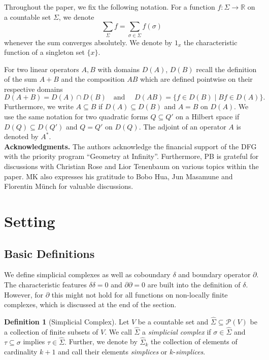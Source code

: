 \documentclass[10pt]{amsart}
\theoremstyle{definition}
\newtheorem{definition}[theorem]{Definition}
\begin{document}
 


Throughout the paper, we fix the following notation. For a function $f:\Sigma\to \mathbb{R}$ on a countable set $\Sigma$, we denote
\begin{equation*}
\sum_{\Sigma}f=	\sum_{\sigma\in \Sigma}f(\sigma)
\end{equation*}
whenever the sum converges absolutely.  We denote by $1_{x}$ the characteristic function of a singleton set $\{x\}$.


For two linear operators $A,B$ with domains $D(A)$, $D(B)$ recall the definition of the sum $A+B$ and the composition $AB$  which are defined pointwise on their respective domains
\begin{equation*}
	D(A+B)=D(A)\cap D(B)\quad \mbox{and }\quad D(AB)=\{f\in D(B)\mid Bf\in D(A)\}.
\end{equation*}
Furthermore, we write $A\subseteq B$ if $D(A) \subseteq D(B)$ and $A=B$ on $D(A)$.  We use the same notation for two quadratic forms $Q\subseteq Q'$ on a Hilbert space if $D(Q)\subseteq D(Q')$ and $Q=Q'$ on $D(Q)$. The adjoint of an operator $A$ is denoted by $A^*.$\\

\textbf{Acknowledgments.} The authors acknowledge the financial support of the DFG with the priority program ``Geometry at Infinity''. Furthermore, PB is grateful for discussions with Christian Rose and Lior Tenenbaum on various topics within the paper. MK also expresses his gratitude to Bobo Hua, Jun Masamune and Florentin Münch for valuable discussions.

  

\section{Setting} \label{setting}
\subsection{Basic Definitions}
We define simplicial complexes as well as coboundary $\delta$ and boundary operator $\partial$. The characteristic features $\delta\delta=0$ and $\partial\partial =0$ are built into the definition of $\delta$. However, for $\partial$ this might not hold for all functions on non-locally finite complexes, which is discussed at the end of the section. 

\begin{definition}[Simplicial Complex]\label{SimplCompl}
Let $V$ be a countable set and $\hat\Sigma\subseteq\mathcal{P}(V)$ be a collection of finite subsets of $V.$ We call $\hat\Sigma$ a \textit{simplicial complex} if $\sigma\in\hat\Sigma$ and $\tau\subseteq \sigma$ implies $\tau\in\hat\Sigma.$ Further, we denote by $\hat\Sigma_{k}$ the collection of elements of cardinality $k+1$  and call their elements \textit{simplices} or $k$-\emph{simplices}.
\end{definition}
\end{document}
